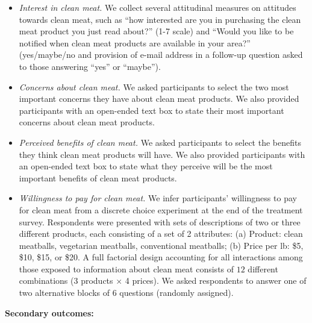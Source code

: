 \documentclass[12pt]{article}
\begin{document}
\begin{itemize}
    \item \textit{Interest in clean meat.} We collect several attitudinal measures on attitudes towards clean meat, such as ``how interested are you in purchasing the clean meat product you just read about?'' (1-7 scale) and ``Would you like to be notified when clean meat products are available in your area?'' (yes/maybe/no and provision of e-mail address in a follow-up question asked to those answering ``yes'' or ``maybe'').

    \item \textit{Concerns about clean meat.} We asked participants to select the two most important concerns they have about clean meat products. We also provided participants with an open-ended text box to state their most important concerns about clean meat products.

    \item \textit{Perceived benefits of clean meat.} We asked participants to select the benefits they think clean meat products will have. We also provided participants with an open-ended text box to state what they perceive will be the most important benefits of clean meat products.

    \item \textit{Willingness to pay for clean meat.} We infer participants’ willingness to pay for clean meat from a discrete choice experiment at the end of the treatment survey. Respondents were presented with sets of descriptions of two or three different products, each consisting of a set of 2 attributes: (a) Product: clean meatballs, vegetarian meatballs, conventional meatballs; (b) Price per lb: \$5, \$10, \$15, or \$20. A full factorial design accounting for all interactions among those exposed to information about clean meat consists of $12$ different combinations (3 products $\times$ 4 prices). We asked respondents to answer one of two alternative blocks of 6 questions (randomly assigned).
\end{itemize}

\textbf{Secondary outcomes:}
\end{document}
